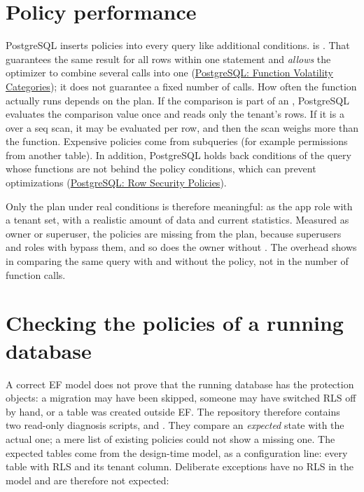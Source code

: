 \section{Policy performance}

PostgreSQL inserts policies into every query like additional  conditions.
 is . That guarantees the same result for
all rows within one statement and \emph{allows} the optimizer to combine several calls into
one (\href{https://www.postgresql.org/docs/17/xfunc-volatility.html}{PostgreSQL: Function Volatility Categories}); it does not guarantee a fixed
number of calls. How often the function actually runs depends on the plan. If the comparison
is part of an , PostgreSQL evaluates the comparison value once and reads only
the tenant's rows. If it is a  over a seq scan, it may be evaluated per row, and
then the scan weighs more than the function. Expensive policies come from subqueries (for
example permissions from another table). In addition, PostgreSQL holds back conditions of the
query whose functions are not  behind the policy conditions, which can prevent
optimizations (\href{https://www.postgresql.org/docs/17/ddl-rowsecurity.html}{PostgreSQL: Row Security Policies}).

Only the plan under real conditions is therefore meaningful:  as the app role with a tenant set, with a
realistic amount of data and current statistics. Measured as owner or superuser, the policies
are missing from the plan, because superusers and roles with  bypass them, and
so does the owner without . The overhead shows in comparing the same query with
and without the policy, not in the number of function calls.

\section{Checking the policies of a running database}\label{sec:policy-diagnosis}

A correct EF model does not prove that the running database has the protection objects: a
migration may have been skipped, someone may have switched RLS off by hand, or a table was
created outside EF. The repository therefore contains two read-only diagnosis scripts,
and . They compare an
\emph{expected} state with the actual one; a mere list of existing policies could not show a
missing one. The expected tables come from the design-time model, as a configuration line: every
table with RLS and its tenant column. Deliberate exceptions have no RLS in the model and are
therefore not expected:

